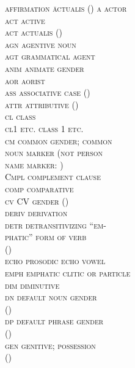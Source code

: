 \documentclass[output=collectionpaper]{langsci/langscibook}
\begin{document}
\begin{multicols}{2}
\begin{tabbing}\relax
\scshape affirmation  \= actualis ()\kill
\scshape a	\>	actor	\\
\scshape act	\>	active	\\
\scshape act	\>	actualis ()	\\
\scshape agn	\>	agentive noun	\\
\scshape agt	\>	grammatical agent	\\
\scshape anim	\>	animate gender	\\
\scshape aor	\>	aorist	\\
\scshape ass	\>	associative case ()	\\
\scshape attr	\>	attributive ()	\\
\scshape cl	\>	class	\\
\scshape cl1 \normalfont etc.	\>	class 1 etc.	\\
\scshape cm	\>	common gender; common\\ \> noun marker (not person \\ \>  name marker: )\\
\normalfont Cmpl	\>	complement clause	\\
\scshape comp	\>	comparative	\\
\scshape cv	\>	CV gender ()	\\
\scshape deriv	\>	derivation	\\
\scshape detr	\>	detransitivizing ``em-\\ \>phatic'' form of verb \\ \> ()	\\
\scshape echo	\>	prosodic echo vowel	\\
\scshape emph	\>	emphatic clitic or particle	\\
\scshape dim	\>	diminutive	\\
\scshape dn	\>	default noun gender \\ \> ()	\\
\scshape dp	\>	default phrase gender \\ \> ()	\\
\scshape gen	\>	genitive; possession \\ \> ()	\\

\end{tabbing}
\end{multicols}
\end{document}
